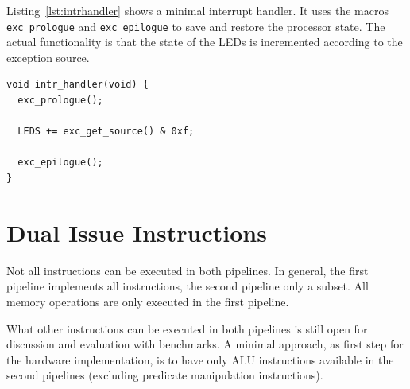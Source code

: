 \documentclass[a4paper,fontsize=10pt,twoside,DIV15,BCOR12mm,headinclude=true,footinclude=false,pagesize,bibtotoc]{scrbook}
\newcommand{\comment}[3]{

\textsf{\textbf{#1}} {\color{#3}#2}}
\newcommand{\martin}[1]{\comment{Martin}{#1}{Blue}}
\newcommand{\stefan}[1]{\comment{Stefan}{#1}{RoyalPurple}}
\renewcommand{\martin}[1]{}
\renewcommand{\stefan}[1]{}
\begin{document}
Listing~\ref{lst:intrhandler} shows a minimal interrupt handler. It
uses the macros \texttt{exc\_prologue} and \texttt{exc\_epilogue} to
save and restore the processor state. The actual functionality is that
the state of the LEDs is incremented according to the exception source.

\begin{lstlisting}[float, caption={Interrupt handler example\label{lst:intrhandler}}]
void intr_handler(void) {
  exc_prologue();

  LEDS += exc_get_source() & 0xf;

  exc_epilogue();
}
\end{lstlisting}


\clearpage
\section{Dual Issue Instructions}

Not all instructions can be executed in both pipelines. In general, the first
pipeline implements all instructions, the second pipeline only a subset.
All memory operations are only executed in the first pipeline.

What other instructions can be executed in both pipelines is still open for
discussion and evaluation with benchmarks. A minimal approach, as first
step for the hardware implementation, is to have only ALU instructions
available in the second pipelines (excluding predicate manipulation instructions).

\stefan{From what I see in the code, it might also help a lot to allow SWS in the
second pipeline, as they are quite common. Predicate instructions are not that common
now but this will change with the new single-path passes.

This section should also talk about hazards, i.e., can we predicate the second
slot with something that we write in the first slot, what if we use a GP register
in both slots and write to it, ... }

\martin{TODO: agree that we/I should write more on this. Currently
Wolfgang has implemented ALU and predicate operations in both
pipelines. More details shall be described.}

\stefan{Is MFS/MTS allowed in both pipelines (and at the same time)? Should be helpful for prologue/epiloge code,
especially when we move return infos back to special registers.}
\end{document}
